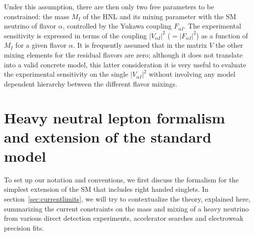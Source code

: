 Under this assumption, there are then only two free parameters to be
constrained: the mass $M_I$ of the HNL and its mixing parameter with
the SM neutrino of flavor $\alpha$, controlled by the Yukawa coupling
$F_{\alpha I}$. The experimental sensitivity is expressed in terms of
the coupling $|V_{\alpha I}|^2$ ($= |F_{\alpha I}|^2$) as a function
of $M_I$ for a given flavor $\alpha$. It is frequently assumed that in
the matrix $V$ the other mixing elements for the residual flavors are
zero; although it does not translate into a valid concrete model, this latter consideration it is very useful to evaluate the experimental sensitivity on the single $|V_{\alpha I}|^2$ without involving any model dependent hierarchy between the different flavor mixings. 

\section{Heavy neutral lepton formalism and extension of the standard model}
To set up our notation and conventions, we first discuss the formalism for the simplest
extension of the SM that includes right handed singlets. In section~\ref{sec:currentlimits}, we will try to contextualize the theory, explained here, summarizing the current constraints on the mass and mixing of a heavy neutrino from various direct
detection experiments, accelerator searches and electroweak precision
fits.

